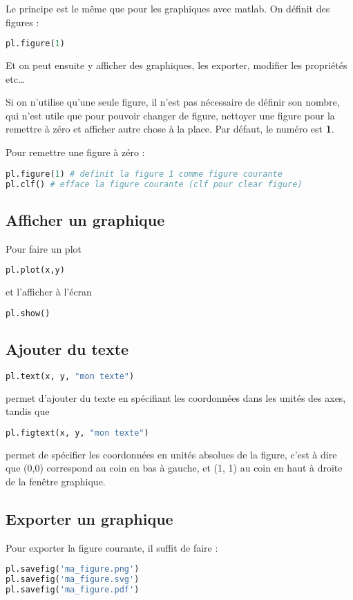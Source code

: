 \documentclass[a4paper,twoside]{article}
\begin{document}
Le principe est le même que pour les graphiques avec matlab. On définit des figures :
\begin{lstlisting}[language=python]
pl.figure(1)
\end{lstlisting}
Et on peut ensuite y afficher des graphiques, les exporter, modifier les propriétés etc\dots

\begin{remarque}
Si on n'utilise qu'une seule figure, il n'est pas nécessaire de définir son nombre, qui n'est utile que pour pouvoir changer de figure, nettoyer une figure pour la remettre à zéro et afficher autre chose à la place. Par défaut, le numéro est \textbf{1}.
\end{remarque}

Pour remettre une figure à zéro :
\begin{lstlisting}[language=python]
pl.figure(1) # definit la figure 1 comme figure courante
pl.clf() # efface la figure courante (clf pour clear figure)
\end{lstlisting}

\subsection{Afficher un graphique}
Pour faire un plot
\begin{lstlisting}[language=python]
pl.plot(x,y)
\end{lstlisting}
et l'afficher à l'écran
\begin{lstlisting}[language=python]
pl.show()
\end{lstlisting}

\subsection{Ajouter du texte}
\begin{lstlisting}[language=python]
pl.text(x, y, "mon texte")
\end{lstlisting}
permet d'ajouter du texte en spécifiant les coordonnées dans les unités des axes, tandis que
\begin{lstlisting}[language=python]
pl.figtext(x, y, "mon texte")
\end{lstlisting}
permet de spécifier les coordonnées en unités absolues de la figure, c'est à dire que (0,0) correspond au coin en bas à gauche, et (1, 1) au coin en haut à droite de la fenêtre graphique.

\subsection{Exporter un graphique}
Pour exporter la figure courante, il suffit de faire :
\begin{lstlisting}[language=python]
pl.savefig('ma_figure.png')
pl.savefig('ma_figure.svg')
pl.savefig('ma_figure.pdf')
\end{lstlisting}
\end{document}
